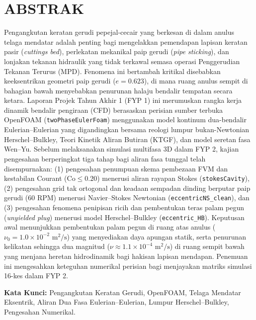 \newpage
{}
\chapter*{ABSTRAK}

\noindent Pengangkutan keratan gerudi pepejal-cecair yang berkesan di dalam anulus telaga mendatar adalah penting bagi mengelakkan pemendapan lapisan keratan pasir (\textit{cuttings bed}), perlekatan mekanikal paip gerudi (\textit{pipe sticking}), dan lonjakan tekanan hidraulik yang tidak terkawal semasa operasi Penggerudian Tekanan Terurus (MPD). Fenomena ini bertambah kritikal disebabkan keeksentrikan geometri paip gerudi ($e = 0.623$), di mana ruang anulus sempit di bahagian bawah menyebabkan penurunan halaju bendalir tempatan secara ketara. Laporan Projek Tahun Akhir 1 (FYP 1) ini merumuskan rangka kerja dinamik bendalir pengiraan (CFD) berasaskan perisian sumber terbuka OpenFOAM (\texttt{twoPhaseEulerFoam}) menggunakan model kontinum dua-bendalir Eulerian--Eulerian yang digandingkan bersama reologi lumpur bukan-Newtonian Herschel--Bulkley, Teori Kinetik Aliran Butiran (KTGF), dan model seretan fasa Wen--Yu. Sebelum melaksanakan simulasi multifasa 3D dalam FYP 2, kajian pengesahan berperingkat tiga tahap bagi aliran fasa tunggal telah disempurnakan: (1) pengesahan penumpuan skema pembezaan FVM dan kestabilan Courant ($\text{Co} \le 0.20$) menerusi aliran rayapan Stokes (\texttt{stokesCavity}), (2) pengesahan grid tak ortogonal dan keadaan sempadan dinding berputar paip gerudi (60 RPM) menerusi Navier--Stokes Newtonian (\texttt{eccentricNS\_clean}), dan (3) pengesahan fenomena penipisan ricih dan pembentukan teras palam pegun (\textit{unyielded plug}) menerusi model Herschel--Bulkley (\texttt{eccentric\_HB}). Keputusan awal menunjukkan pembentukan palam pegun di ruang atas anulus ($\nu_0 = 1.0 \times 10^{-2}\text{ m}^2/\text{s}$) yang menyediakan daya apungan statik, serta penurunan kelikatan sehingga dua magnitud ($\nu \approx 1.1 \times 10^{-4}\text{ m}^2/\text{s}$) di ruang sempit bawah yang menjana heretan hidrodinamik bagi hakisan lapisan mendapan. Penemuan ini mengesahkan keteguhan numerikal perisian bagi menjayakan matriks simulasi 16-kes dalam FYP 2.

\vspace{0.6cm}
\noindent \textbf{Kata Kunci:} Pengangkutan Keratan Gerudi, OpenFOAM, Telaga Mendatar Eksentrik, Aliran Dua Fasa Eulerian--Eulerian, Lumpur Herschel--Bulkley, Pengesahan Numerikal.
